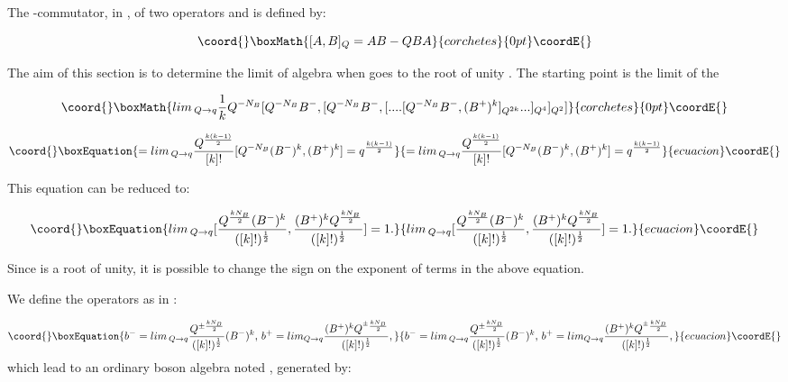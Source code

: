 \documentclass[a4paper,12pt,thmsa]{article}
\begin{document}
The \coordHE{}-commutator, in \coordHE{}, of two operators \coordHE{} and \coordHE{} is defined by:

\[\coord{}\boxMath{
\lbrack A,B]_Q=AB-QBA
}{corchetes}{0pt}\coordE{}\]

The aim of this section is to determine the limit of \coordHE{} algebra
when \coordHE{} goes to the root of unity \coordHE{}. The starting point is the limit \coordHE{} of the \coordHE{}

\[\coord{}\boxMath{
lim\, _{Q\rightarrow q}\frac
1kQ^{-N_B}[Q^{-N_B}B^{-},[Q^{-N_B}B^{-},[....[Q^{-N_B}B^{-},(B^{+})^k]_{Q^{2k}}...]_{Q^4}]_{Q^2}]
}{corchetes}{0pt}\coordE{}\]

\begin{equation}\coord{}\boxEquation{
=lim\, _{Q\rightarrow q}\frac{Q^{\frac{k(k-1)}2}}{[k]!}[
Q^{-N_B}(B^{-})^k,(B^{+})^k]=q^{\frac{k(k-1)}2}
}{
=lim\, _{Q\rightarrow q}\frac{Q^{\frac{k(k-1)}2}}{[k]!}[
Q^{-N_B}(B^{-})^k,(B^{+})^k]=q^{\frac{k(k-1)}2}
}{ecuacion}\coordE{}\end{equation}

This equation can be reduced to:

\begin{equation}\coord{}\boxEquation{
lim\, _{Q\rightarrow
q}[\frac{Q^{\frac{kN_B}2}(B^{-})^k}{([k]!)^{\frac
12}},\frac{(B^{+})^kQ^{\frac{kN_B}2}}{([k]!)^{\frac 12}}]=1.
}{
lim\, _{Q\rightarrow
q}[\frac{Q^{\frac{kN_B}2}(B^{-})^k}{([k]!)^{\frac
12}},\frac{(B^{+})^kQ^{\frac{kN_B}2}}{([k]!)^{\frac 12}}]=1.
}{ecuacion}\coordE{}\end{equation}

Since \coordHE{} is a root of unity, it is possible to change the sign on the
exponent of \coordHE{} terms in the above equation.

We define the operators as in \myHighlight{$[18]$}\coordHE{}:

\begin{equation}\coord{}\boxEquation{
b^{-}=lim\, _{Q\rightarrow q}\frac{Q^{\pm
\frac{kN_B}2}}{([k]!)^{\frac
12}}(B^{-})^k,\, b^{+}=lim_{Q\rightarrow q}\frac{(B^{+})^kQ^{^{\pm }
\frac{kN_B}2}}{([k]!)^{\frac 12}},
}{
b^{-}=lim\, _{Q\rightarrow q}\frac{Q^{\pm
\frac{kN_B}2}}{([k]!)^{\frac
12}}(B^{-})^k,\, b^{+}=lim_{Q\rightarrow q}\frac{(B^{+})^kQ^{^{\pm }
\frac{kN_B}2}}{([k]!)^{\frac 12}},
}{ecuacion}\coordE{}\end{equation}
which lead to an ordinary boson algebra noted \coordHE{}, generated by:
\end{document}
